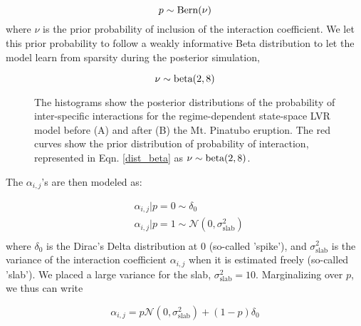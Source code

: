 \documentclass[11pt]{article}
\begin{document}
{\begin{equation}\label{dist_bern}
	p \sim \textnormal{Bern}(\nu)
\end{equation}
where $\nu$ is the prior probability of inclusion of the interaction coefficient. We let this prior probability to follow a weakly informative Beta distribution to let the model learn from sparsity during the posterior simulation,

\begin{equation}\label{dist_beta}
	\nu \sim \textnormal{beta}(2,8)
\end{equation}

\renewcommand{\thefigure}{S1}
\begin{figure}[t]
	\centering
	\qquad
	\caption{The histograms show the posterior distributions of the probability of inter-specific interactions for the regime-dependent state-space LVR model before (A) and after (B) the Mt. Pinatubo eruption. The red curves show the prior distribution of probability of interaction, represented in Eqn. \ref{dist_beta} as $ \nu \sim \textnormal{beta}(2,8)$. }
	\label{fig:PriorPosSSVS}%
\end{figure}

The $\alpha_{i,j}$'s are then modeled as:

\begin{equation}\label{Spike_and_slab}
	\begin{aligned}
		&\alpha_{i,j} | p = 0 \sim \delta_{0} \\
		&\alpha_{i,j} | p = 1 \sim \mathcal{N}\left(0, \sigma^2_{\text{slab}} \right) \\
	\end{aligned}
\end{equation}
where $\delta_{0}$ is the Dirac's Delta distribution at 0 (so-called 'spike'), and $\sigma^2_{\text{slab}}$ is the variance of the interaction coefficient $\alpha_{i,j}$ when it is estimated freely (so-called 'slab'). We placed a large variance for the slab, $\sigma^2_{\text{slab}} = 10 $. Marginalizing over $p$, we thus can write

\begin{equation}\label{MargSaS}
	\alpha_{i,j} = p \mathcal{N}(0, \sigma^2_{\text{slab}}) + (1 - p) \delta_{0}
\end{equation}

}
\end{document}
